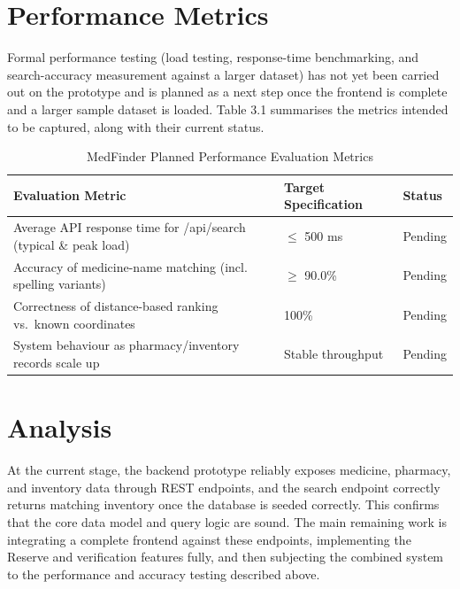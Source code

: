 \documentclass[11pt,a4paper]{report}
\begin{document}
\section{Performance Metrics}

Formal performance testing (load testing, response-time benchmarking, and search-accuracy measurement against a larger dataset) has not yet been carried out on the prototype and is planned as a next step once the frontend is complete and a larger sample dataset is loaded. Table 3.1 summarises the metrics intended to be captured, along with their current status.

\begin{table}[h!]
\centering
\small
\begin{tabular}{p{6.2cm}p{4cm}p{2.8cm}}
\toprule
\textbf{Evaluation Metric} & \textbf{Target Specification} & \textbf{Status} \\
\midrule
Average API response time for /api/search (typical \& peak load) & $\leq$ 500 ms & Pending \\
Accuracy of medicine-name matching (incl. spelling variants) & $\geq$ 90.0\% & Pending \\
Correctness of distance-based ranking vs.\ known coordinates & 100\% & Pending \\
System behaviour as pharmacy/inventory records scale up & Stable throughput & Pending \\
\bottomrule
\end{tabular}
\caption{MedFinder Planned Performance Evaluation Metrics}
\end{table}

\section{Analysis}

At the current stage, the backend prototype reliably exposes medicine, pharmacy, and inventory data through REST endpoints, and the search endpoint correctly returns matching inventory once the database is seeded correctly. This confirms that the core data model and query logic are sound. The main remaining work is integrating a complete frontend against these endpoints, implementing the Reserve and verification features fully, and then subjecting the combined system to the performance and accuracy testing described above.

\end{document}

